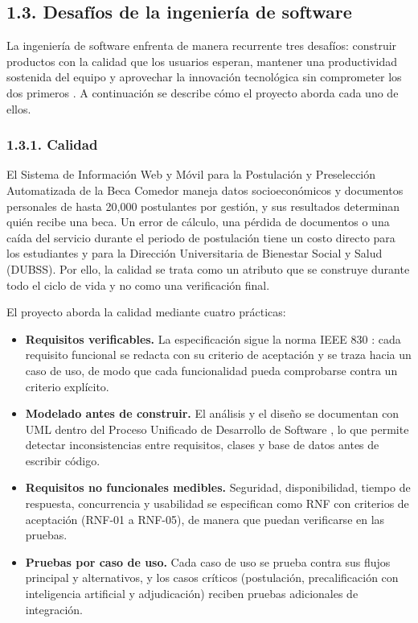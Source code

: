 \subsection{1.3. Desafíos de la ingeniería de software}

La ingeniería de software enfrenta de manera recurrente tres desafíos: construir productos con la calidad que los usuarios esperan, mantener una productividad sostenida del equipo y aprovechar la innovación tecnológica sin comprometer los dos primeros \parencite{pressman2010ingenieria}. A continuación se describe cómo el proyecto aborda cada uno de ellos.

\subsubsection{1.3.1. Calidad}

El Sistema de Información Web y Móvil para la Postulación y Preselección Automatizada de la Beca Comedor maneja datos socioeconómicos y documentos personales de hasta 20,000 postulantes por gestión, y sus resultados determinan quién recibe una beca. Un error de cálculo, una pérdida de documentos o una caída del servicio durante el periodo de postulación tiene un costo directo para los estudiantes y para la Dirección Universitaria de Bienestar Social y Salud (DUBSS). Por ello, la calidad se trata como un atributo que se construye durante todo el ciclo de vida y no como una verificación final.

El proyecto aborda la calidad mediante cuatro prácticas:

\begin{itemize}
    \item \textbf{Requisitos verificables.} La especificación sigue la norma IEEE 830 \parencite{ieee830_1998}: cada requisito funcional se redacta con su criterio de aceptación y se traza hacia un caso de uso, de modo que cada funcionalidad pueda comprobarse contra un criterio explícito.
    \item \textbf{Modelado antes de construir.} El análisis y el diseño se documentan con UML \parencite{booch2005uml, rumbaugh2004uml} dentro del Proceso Unificado de Desarrollo de Software \parencite{jacobson1999unified}, lo que permite detectar inconsistencias entre requisitos, clases y base de datos antes de escribir código.
    \item \textbf{Requisitos no funcionales medibles.} Seguridad, disponibilidad, tiempo de respuesta, concurrencia y usabilidad se especifican como RNF con criterios de aceptación (RNF-01 a RNF-05), de manera que puedan verificarse en las pruebas.
    \item \textbf{Pruebas por caso de uso.} Cada caso de uso se prueba contra sus flujos principal y alternativos, y los casos críticos (postulación, precalificación con inteligencia artificial y adjudicación) reciben pruebas adicionales de integración.
\end{itemize}

